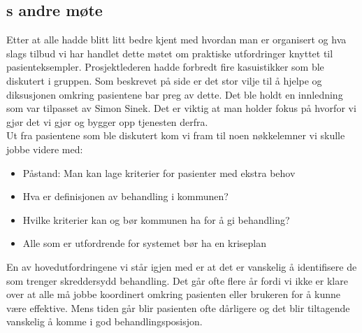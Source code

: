 \documentclass[11pt]{report} %
\begin{document}
                  \subsection{s andre møte}\label{sec:agr_2}
                    Etter at alle hadde blitt litt bedre kjent med hvordan man er organisert og hva slags tilbud vi har handlet dette møtet om praktiske utfordringer knyttet til pasienteksempler. Prosjektlederen hadde forbredt fire kasuistikker som ble diskutert i gruppen. Som beskrevet på side \pageref{stor_vilje_til_hjelp} er det stor vilje til å hjelpe og diksusjonen omkring pasientene bar preg av dette\cite{arbgr_mref-2}. Det ble holdt en innledning som var tilpasset av Simon Sinek\cite{sinek09}. Det er viktig at man holder fokus på hvorfor vi gjør det vi gjør og bygger opp tjenesten derfra. \\
                    Ut fra pasientene som ble diskutert kom vi fram til noen nøkkelemner vi skulle jobbe videre med:\\
                      \begin{itemize}
                        \item Påstand: Man kan lage kriterier for pasienter med ekstra behov\\
                        \item Hva er definisjonen av behandling i kommunen?\\
                        \item Hvilke kriterier kan og bør kommunen ha for å gi behandling?\\
                        \item Alle som er utfordrende for systemet bør ha en kriseplan\\
                      \end{itemize}
                    En av hovedutfordringene vi står igjen med er at det er vanskelig å identifisere de som trenger skreddersydd behandling. Det går ofte flere år fordi vi ikke er klare over at alle må jobbe koordinert omkring pasienten eller brukeren for å kunne være effektive. Mens tiden går blir pasienten ofte dårligere og det blir tiltagende vanskelig å komme i god behandlingsposisjon.   
\end{document}
